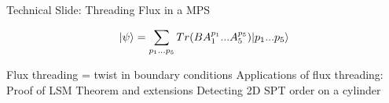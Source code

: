 \begin{frame}{Technical Slide: Threading Flux in a MPS}

\begin{figure}[h]
    \centering
    \scalebox{1}{
    
    }
\end{figure}

$$
\vert \psi \rangle = \sum\limits_{p_1 ... p_5}   Tr(B A^{p_1}_1 ... A^{p_5}_5)\vert p_1 ... p_5 \rangle 
$$

Flux threading = twist in boundary conditions
Applications of flux threading: 
Proof of LSM Theorem  and extensions
Detecting 2D SPT order on a cylinder

\end{frame}